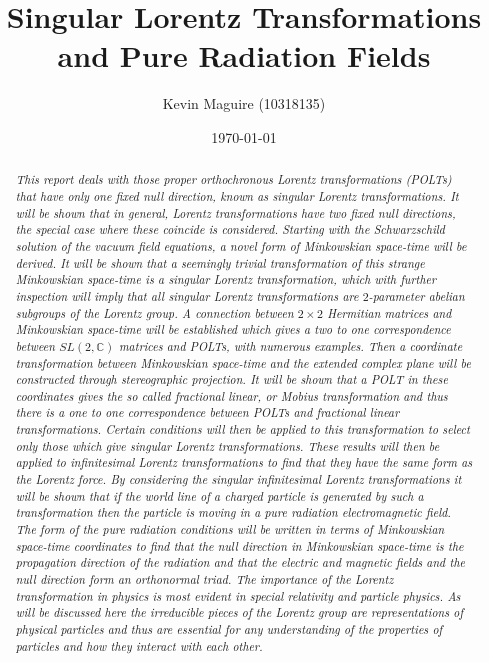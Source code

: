 \documentclass[floatfix,aps,prd,amsmath,amssymb]{revtex4}
\begin{document}
\title{Singular Lorentz Transformations and Pure Radiation Fields}
\author{Kevin Maguire (10318135)}
\date{\today}

\begin{abstract}
\textit{This report deals with those proper orthochronous Lorentz transformations (POLTs) that have only one fixed null direction, known as singular Lorentz transformations. It will be shown that in general, Lorentz transformations have two fixed null directions, the special case where these coincide is considered. Starting with the Schwarzschild solution of the vacuum field equations, a novel form of Minkowskian space-time will be derived. It will be shown that a seemingly trivial transformation of this strange Minkowskian space-time is a singular Lorentz transformation, which with further inspection will imply that all singular Lorentz transformations are $2$-parameter abelian subgroups of the Lorentz group. A connection between $2 \times 2$ Hermitian matrices and Minkowskian space-time will be established which gives a two to one correspondence between $SL(2,\mathbb{C})$ matrices and POLTs, with numerous examples. Then a coordinate transformation between Minkowskian space-time and the extended complex plane will be constructed through stereographic projection. It will be shown that a POLT in these coordinates gives the so called fractional linear, or Mobius transformation and thus there is a one to one correspondence between POLTs and fractional linear transformations. Certain conditions will then be applied to this transformation to select only those which give singular Lorentz transformations. These results will then be applied to infinitesimal Lorentz transformations to find that they have the same form as the Lorentz force. By considering the singular infinitesimal Lorentz transformations it will be shown that if the world line of a charged particle is generated by such a transformation then the particle is moving in a pure radiation electromagnetic field. The form of the pure radiation conditions will be written in terms of Minkowskian space-time coordinates to find that the null direction in Minkowskian space-time is the propagation direction of the radiation and that the electric and magnetic fields and the null direction form an orthonormal triad. The importance of the Lorentz transformation in physics is most evident in special relativity and particle physics. As will be discussed here the irreducible pieces of the Lorentz group are representations of physical particles and thus are essential for any understanding of the properties of particles and how they interact with each other.}
\end{abstract}
\end{document}
